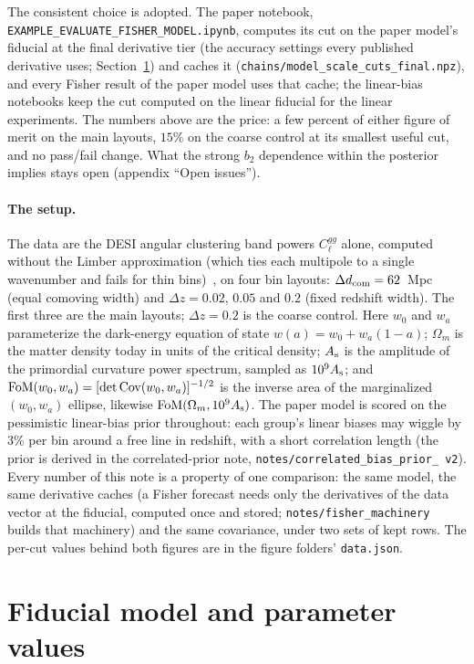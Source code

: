 \documentclass[11pt]{article}
\newcommand{\dcom}{$\Delta d_{\rm com} = 62$~Mpc}
\newcommand{\us}{\_\allowbreak}
\begin{document}
The consistent choice is adopted.  The paper notebook,
\texttt{EXAMPLE\us EVALUATE\us FISHER\us MODEL.ipynb}, computes its
cut on the paper model's fiducial at the final derivative tier (the
accuracy settings every published derivative uses;
Section~\ref{sec:fiducial}) and
caches it (\texttt{chains/model\us scale\us cuts\us final.npz}), and
every Fisher result of the paper model uses that cache; the
linear-bias notebooks keep the cut computed on the linear fiducial
for the linear experiments.  The numbers above are
the price: a few percent of either figure of merit on the main
layouts, $15\%$ on the coarse control at its smallest useful cut, and
no pass/fail change.  What the strong $b_2$ dependence within the
posterior implies stays open (appendix ``Open issues'').

\paragraph{The setup.}
The data are the DESI angular clustering band powers $C_\ell^{gg}$
alone, computed without the Limber
approximation (which ties each multipole to a single wavenumber and
fails for thin bins)~\cite{FangKEM2020}, on four bin layouts: \dcom{} (equal
comoving width) and $\Delta z = 0.02$, $0.05$ and $0.2$ (fixed
redshift width).  The first three are the main layouts;
$\Delta z = 0.2$ is the coarse control.  Here $w_0$ and $w_a$
parameterize the dark-energy equation of state
$w(a) = w_0 + w_a(1 - a)$; $\Omega_m$ is the matter density today in
units of the critical density; $A_{\rm s}$ is the amplitude of the
primordial curvature power spectrum, sampled as $10^9 A_{\rm s}$; and
${\rm FoM}(w_0, w_a) = [\det{\rm Cov}(w_0, w_a)]^{-1/2}$ is the
inverse area of the marginalized $(w_0, w_a)$ ellipse, likewise
${\rm FoM}(\Omega_m, 10^9 A_{\rm s})$.  The paper model is scored on
the pessimistic linear-bias prior throughout: each group's linear
biases may wiggle by $3\%$ per bin around a free line in redshift,
with a short correlation length (the prior is derived in the
correlated-prior note, \texttt{notes/correlated\us bias\us prior\us
v2}).  Every number of this
note is a property of one comparison: the same model, the same
derivative caches (a Fisher forecast needs only the derivatives of
the data vector at the fiducial, computed once and stored;
\texttt{notes/fisher\us machinery} builds that machinery) and the
same covariance, under two sets of kept
rows.  The per-cut values behind both figures are in the figure
folders' \texttt{data.json}.

\section{Fiducial model and parameter values}
\label{sec:fiducial}
\end{document}
